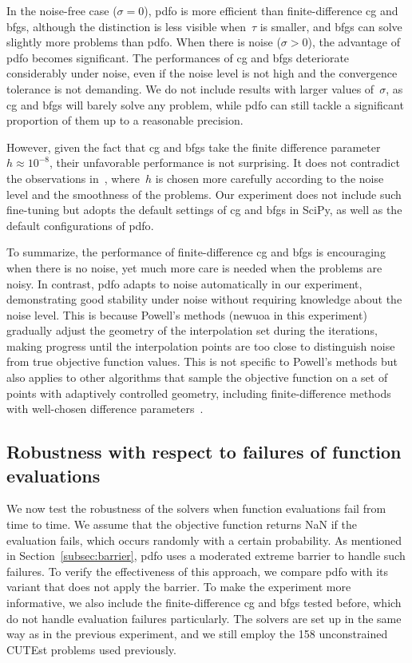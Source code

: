 \documentclass[manuscript,screen,review]{acmart}
\numberwithin{equation}{section}
\begin{document}
In the noise-free case ($\sigma = 0$), \gls{pdfo} is more efficient than finite-difference \gls{cg} and \gls{bfgs}, although the distinction is less visible when~$\tau$ is smaller, and \gls{bfgs} can solve slightly more problems than \gls{pdfo}.
When there is noise ($\sigma >0$), the advantage of \gls{pdfo} becomes significant.
The performances of \gls{cg} and \gls{bfgs} deteriorate considerably under noise, even if the noise level is not high and the convergence tolerance is not demanding.
We do not include results with larger values of~$\sigma$, as \gls{cg} and \gls{bfgs} will barely solve any problem, while \gls{pdfo} can still tackle a significant proportion of them up to a reasonable precision.

However, given the fact that \gls{cg} and \gls{bfgs} take the finite difference parameter~$h \approx 10^{-8}$, their unfavorable performance is not surprising.
It does not contradict the observations in~\cite{Shi_Etal_2022a,Shi_Etal_2022}, where~$h$ is chosen more carefully according to the noise level and the smoothness of the problems.
Our experiment does not include such fine-tuning but adopts the default settings of \gls{cg} and \gls{bfgs} in SciPy, as well as the default configurations of \gls{pdfo}.

To summarize, the performance of finite-difference \gls{cg} and \gls{bfgs} is encouraging when there is no noise, yet much more care is needed when the problems are noisy.
In contrast, \gls{pdfo} adapts to noise automatically in our experiment, demonstrating good stability under noise without requiring knowledge about the noise level.
This is because Powell's methods (\gls{newuoa} in this experiment) gradually adjust the geometry of the interpolation set during the iterations, making progress until the interpolation points are too close to distinguish noise from true objective function values.
This is not specific to Powell's methods but also applies to other algorithms that sample the objective function on a set of points with adaptively controlled geometry, including finite-difference methods with well-chosen difference parameters~\cite{Shi_Etal_2022a}.

\subsection{Robustness with respect to failures of function evaluations}
\label{subsec:nan}

We now test the robustness of the solvers when function evaluations fail from time to time.
We assume that the objective function returns NaN if the evaluation fails, which occurs randomly with a certain probability.
As mentioned in Section~\ref{subsec:barrier}, \gls{pdfo} uses a moderated extreme barrier to handle such failures.
To verify the effectiveness of this approach, we compare \gls{pdfo} with its variant that does not apply the barrier.
To make the experiment more informative, we also include the finite-difference \gls{cg} and \gls{bfgs} tested before, which do not handle evaluation failures particularly.
The solvers are set up in the same way as in the previous experiment, and we still employ the \num{158} unconstrained CUTEst problems used previously.
\end{document}
